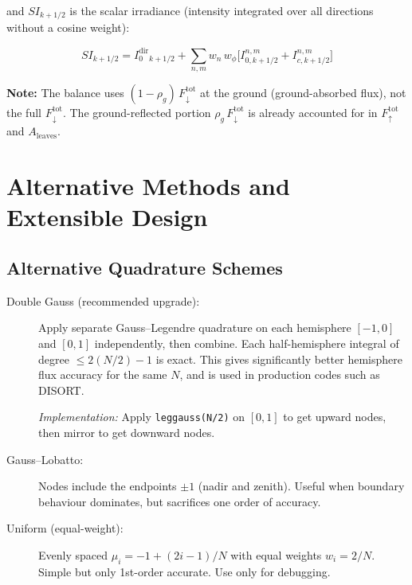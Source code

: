 \documentclass[12pt]{article}
\begin{document}
and $SI_{k+1/2}$ is the scalar irradiance (intensity integrated over all
directions without a cosine weight):

\begin{equation}
  SI_{k+1/2} = I_0^\mathrm{dir}{}_{k+1/2}
  + \sum_{n,m} w_n\,w_\phi
    \bigl[I_{0,k+1/2}^{n,m} + I_{c,k+1/2}^{n,m}\bigr]
\end{equation}

\textbf{Note:} The balance uses $(1-\rho_g)\,F_\downarrow^\mathrm{tot}$ at the
ground (ground-absorbed flux), not the full $F_\downarrow^\mathrm{tot}$. The
ground-reflected portion $\rho_g\,F_\downarrow^\mathrm{tot}$ is already
accounted for in $F_\uparrow^\mathrm{tot}$ and $A_\mathrm{leaves}$.

\section{Alternative Methods and Extensible Design}

\subsection{Alternative Quadrature Schemes}

\begin{description}
  \item[Double Gauss (recommended upgrade):] Apply separate Gauss--Legendre
    quadrature on each hemisphere $[-1,0]$ and $[0,1]$ independently, then
    combine. Each half-hemisphere integral of degree $\leq 2(N/2)-1$ is exact.
    This gives significantly better hemisphere flux accuracy for the same $N$,
    and is used in production codes such as DISORT.

    \emph{Implementation:} Apply \texttt{leggauss(N/2)} on $[0,1]$ to get
    upward nodes, then mirror to get downward nodes.

  \item[Gauss--Lobatto:] Nodes include the endpoints $\pm 1$ (nadir and
    zenith). Useful when boundary behaviour dominates, but sacrifices one
    order of accuracy.

  \item[Uniform (equal-weight):] Evenly spaced $\mu_i = -1 + (2i-1)/N$ with
    equal weights $w_i = 2/N$. Simple but only 1st-order accurate. Use only
    for debugging.
\end{description}
\end{document}
